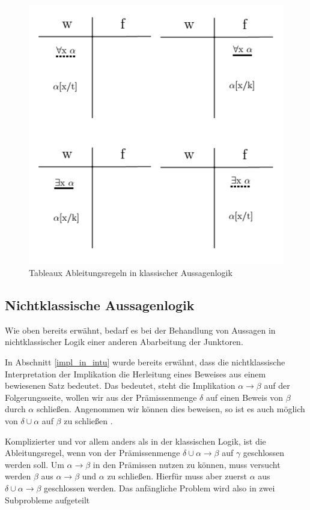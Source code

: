 \begin{figure}
\begin{center}
\includegraphics[scale=0.7]{images/Tableaux_Rules_Pred_Logic.png}
\caption{Tableaux Ableitungsregeln in klassischer Aussagenlogik}
\label{tableaux_class_pred_all_rules}
\end{center}
\end{figure}

\subsection{\label{tableaux_impl_descr}Nichtklassische Aussagenlogik}
Wie oben bereits erwähnt, bedarf es bei der Behandlung von Aussagen in nichtklassischer Logik einer anderen Abarbeitung der Junktoren.

In Abschnitt \ref{impl_in_intu} wurde bereits erwähnt, dass die nichtklassische Interpretation der Implikation die Herleitung eines Beweises aus einem bewiesenen Satz bedeutet. Das bedeutet, steht die Implikation $\alpha\rightarrow\beta$ auf der Folgerungsseite, wollen wir aus der Prämissenmenge $\delta$ auf einen Beweis von $\beta$ durch $\alpha$ schließen. Angenommen wir können dies beweisen, so ist es auch möglich von $\delta\cup\alpha$ auf $\beta$ zu schließen \cite{B62}.

Komplizierter und vor allem anders als in der klassischen Logik, ist die Ableitungsregel, wenn von der Prämissenmenge $\delta\cup\alpha\rightarrow\beta$ auf $\gamma$ geschlossen werden soll. Um $\alpha\rightarrow\beta$ in den Prämissen nutzen zu können, muss versucht werden $\beta$ aus $\alpha\rightarrow\beta$ und $\alpha$ zu schließen. Hierfür muss aber zuerst $\alpha$ aus $\delta\cup\alpha\rightarrow\beta$ geschlossen werden. Das anfängliche Problem wird also in zwei Subprobleme aufgeteilt \cite{B62}

